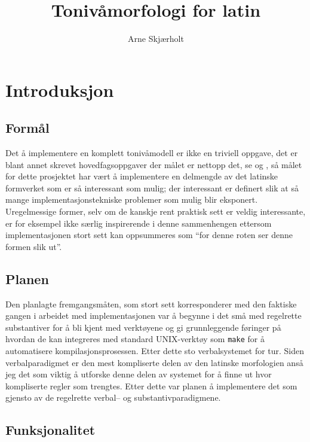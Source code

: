 \documentclass{article}
\title{Toniv\aa{}morfologi for latin}
\author{Arne Skj\ae{}rholt}
\begin{document}
\maketitle
\tableofcontents

\section{Introduksjon}
\subsection{Form\aa{}l}
Det \aa{} implementere en komplett toniv\aa{}modell er ikke en triviell
oppgave, det er blant annet skrevet hovedfagsoppgaver der m\aa{}let er nettopp
det, se \cite{bondihoved} og \cite{french}, s\aa{} m\aa{}let for dette
prosjektet har v\ae{}rt \aa{} implementere en delmengde av det latinske
formverket som er s\aa{} interessant som mulig; der interessant er definert
slik at s\aa{} mange implementasjonstekniske problemer som mulig blir
eksponert. Uregelmessige former, selv om de kanskje rent praktisk sett er
veldig interessante, er for eksempel ikke s\ae{}rlig inspirerende i denne
sammenhengen ettersom implementasjonen stort sett kan oppsummeres som ``for
denne roten ser denne formen slik ut''.

\subsection{Planen}
Den planlagte fremgangsm\aa{}ten, som stort sett korresponderer med den
faktiske gangen i arbeidet med implementasjonen var \aa{} begynne i det
sm\aa{} med regelrette substantiver for \aa{} bli kjent med verkt\o{}yene og
gi grunnleggende f\o{}ringer p\aa{} hvordan de kan integreres med standard
UNIX-verkt\o{}y som \texttt{make} for \aa{} automatisere
kompilasjonsprosessen. Etter dette sto verbalsystemet for tur. Siden
verbalparadigmet er den mest kompliserte delen av den latinske morfologien
ans\aa{} jeg det som viktig \aa{} utforske denne delen av systemet for \aa{}
finne ut hvor kompliserte regler som trengtes. Etter dette var planen \aa{}
implementere det som gjensto av de regelrette verbal-- og
substantivparadigmene.

\subsection{Funksjonalitet}
\end{document}
